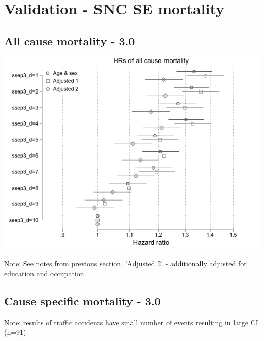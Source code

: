 \documentclass[a4paper, notitlepage, fleqn]{article} %
\begin{document}
\newpage
\section{Validation - SNC SE mortality}

\subsection{All cause mortality - 3.0}
\begin{center}
\includegraphics[width=.75\textwidth]{gr/d_al_adj3.pdf} 
\end{center}

Note: See notes from previous section. 
'Adjusted 2' - additionally adjusted for education and occupation.

\newpage
\subsection{Cause specific mortality - 3.0}
\begin{stlog}\end{stlog}
Note: results of traffic accidents have small number of events resulting in large CI (n=91)
\end{document}
